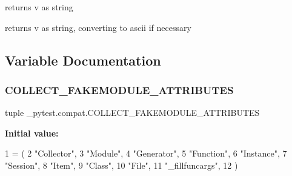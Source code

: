\begin{DoxyVerb}returns v as string\end{DoxyVerb}


\begin{DoxyVerb}returns v as string, converting to ascii if necessary\end{DoxyVerb}
 

\subsection{Variable Documentation}
\mbox{\label{namespace__pytest_1_1compat_ac7925fdc089c3e62d7da95406b4c0d9d}} 
\subsubsection{\texorpdfstring{C\+O\+L\+L\+E\+C\+T\+\_\+\+F\+A\+K\+E\+M\+O\+D\+U\+L\+E\+\_\+\+A\+T\+T\+R\+I\+B\+U\+T\+ES}{COLLECT\_FAKEMODULE\_ATTRIBUTES}}
{\footnotesize\ttfamily tuple \+\_\+pytest.\+compat.\+C\+O\+L\+L\+E\+C\+T\+\_\+\+F\+A\+K\+E\+M\+O\+D\+U\+L\+E\+\_\+\+A\+T\+T\+R\+I\+B\+U\+T\+ES}

{\bfseries Initial value\+:}
\begin{DoxyCode}
1 =  (
2     \textcolor{stringliteral}{"Collector"},
3     \textcolor{stringliteral}{"Module"},
4     \textcolor{stringliteral}{"Generator"},
5     \textcolor{stringliteral}{"Function"},
6     \textcolor{stringliteral}{"Instance"},
7     \textcolor{stringliteral}{"Session"},
8     \textcolor{stringliteral}{"Item"},
9     \textcolor{stringliteral}{"Class"},
10     \textcolor{stringliteral}{"File"},
11     \textcolor{stringliteral}{"\_fillfuncargs"},
12 )
\end{DoxyCode}
